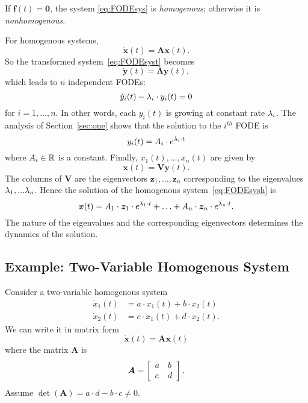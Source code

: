 \documentclass[letterpaper,12pt,leqno]{article}
\begin{document}
If $\bm{f}(t) =\bm{0}$, the system \eqref{eq:FODEsys} is \textit{homogenous}; otherwise it is \textit{nonhomogenous}. 

For homogenous systems, 
\begin{equation}
\bm{\dot{x}}(t) =\bm{A} \bm{x}(t).  \label{eq:FODEsysh}
\end{equation}
So the transformed system~\eqref{eq:FODEsyst} becomes 
\begin{equation*}
\bm{\dot{y}}(t) =\bm{\Lambda}\bm{y}(t) ,
\end{equation*}
which leads to $n$ independent FODEs:
\begin{equation*}
\dot{y}_{i}(t) -\lambda_{i} \cdot y_{i}(t)=0
\end{equation*}
for $i=1,\ldots,n$. In other words, each $y_{i}(t) $ is growing at constant rate $\lambda_{i}$. The analysis of Section~\ref{sec:one} shows that the solution to the $i^{th}$ FODE is 
\begin{equation*}
y_{i}(t) =A_{i}\cdot e^{\lambda_{i}\cdot t}
\end{equation*}
where $A_{i}\in \mathbb{R}$ is a constant. Finally, $x_{1}(t),\ldots,x_{n}(t)$ are given by
\begin{equation*}
\bm{x}(t) =\bm{V} \bm{y}(t) .
\end{equation*}
The columns of $\bm{V}$ are the eigenvectors $\bm{z}_{1},\ldots,\bm{z}_{n}$ corresponding to the
eigenvalues $\lambda_{1},...\lambda_{n}$. Hence the solution of the homogenous system~\eqref{eq:FODEsysh} is 
\begin{equation}
\bm{x}(t) =A_{1}\cdot \bm{z}_{1} \cdot e^{\lambda_{1}\cdot t}+\ldots+A_{n}\cdot \bm{z}_{n}\cdot e^{\lambda_{n}\cdot t}.\label{eq:SOLEV}
\end{equation}
The nature of the eigenvalues and the corresponding eigenvectors determines
the dynamics of the solution. 

\subsection{Example: Two-Variable Homogenous System}
Consider a two-variable homogenous system
\begin{align*}
\dot{x}_{1}(t) &=a\cdot x_{1}(t)+b\cdot x_{2}(t) \\
\dot{x}_{2}(t) &=c\cdot x_{1}(t)+d\cdot x_{2}(t).
\end{align*}
We can write it in matrix form
\begin{equation*}
\bm{\dot{x}}(t) =\bm{A} \bm{x}(t)
\end{equation*}
where the matrix $\bm{A}$ is 
\begin{equation*}
\bm{A}=\left[ 
\begin{array}{ll}
a & b \\ 
c & d
\end{array} \right].
\end{equation*}
Assume $\det(\bm{A}) =a\cdot d-b\cdot c\neq 0. $
\end{document}
